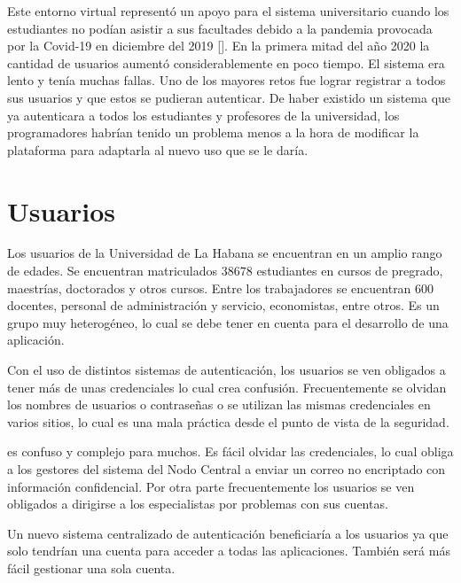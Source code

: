 Este entorno virtual representó un apoyo para el sistema universitario cuando los estudiantes no podían asistir a sus facultades debido a la pandemia provocada por la Covid-19 en diciembre del 2019 [\cite{ferrer2020pandemia}]. En la primera mitad del año 2020 la cantidad de usuarios aumentó considerablemente en poco tiempo. El sistema era lento y tenía muchas fallas. Uno de los mayores retos fue lograr registrar a todos sus usuarios y que estos se pudieran autenticar. De haber existido un sistema que ya autenticara a todos los estudiantes y profesores de la universidad, los programadores habrían tenido un problema menos a la hora de modificar la plataforma para adaptarla al nuevo uso que se le daría.

\section*{Usuarios}

Los usuarios de la Universidad de La Habana se encuentran en un amplio rango de edades. Se encuentran matriculados $38 678$ estudiantes en cursos de pregrado, maestrías, doctorados y otros cursos. Entre los trabajadores se encuentran $600$ docentes, personal de administración y servicio, economistas, entre otros. Es un grupo muy heterogéneo, lo cual se debe tener en cuenta para el desarrollo de una aplicación.

Con el uso de distintos sistemas de autenticación, los usuarios se ven obligados a tener más de unas credenciales lo cual crea confusión. Frecuentemente se olvidan los nombres de usuarios o contraseñas o se utilizan las mismas credenciales en varios sitios, lo cual es una mala práctica desde el punto de vista de la seguridad.


es confuso y complejo para muchos. Es fácil olvidar las credenciales, lo cual obliga a los gestores del sistema del Nodo Central a enviar un correo no encriptado con información confidencial. Por otra parte frecuentemente los usuarios se ven obligados a dirigirse a los especialistas por problemas con sus cuentas. 

Un nuevo sistema centralizado de autenticación beneficiaría a los usuarios ya que solo tendrían una cuenta para acceder a todas las aplicaciones. También será más fácil gestionar una sola cuenta.